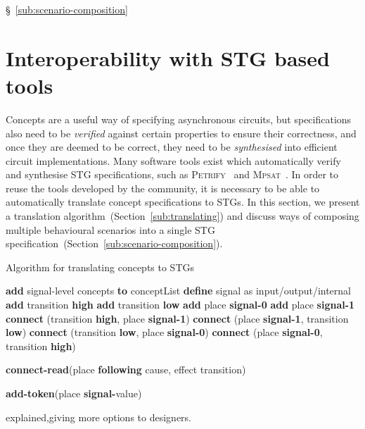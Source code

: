 \documentclass[british, journal]{IEEEtran}
\newcommand{\noun}[1]{\textsc{#1}}
\begin{document}
\S~\ref{sub:scenario-composition}
\vspace{-1mm}
\section{Interoperability with STG based tools\label{sec:interop-with-stg}}

Concepts are a useful way of specifying asynchronous circuits, but
specifications also need to be \emph{verified} against certain properties to
ensure
their correctness, and once they are deemed to be correct, they need to
be \emph{synthesised} into efficient circuit implementations. Many software
tools exist which automatically verify and synthesise STG specifications,
such as \noun{Petrify}~\cite{Cortadella} and
\noun{Mpsat}~\cite{khomenko2004detecting}.
In order to reuse the tools developed by the community, it is
necessary to be able to automatically translate concept specifications to STGs.
In this section, we present a translation
algorithm~(Section~\ref{sub:translating})
and discuss ways of composing multiple behavioural scenarios into a single STG
specification~(Section~\ref{sub:scenario-composition}).

\begin{algorithm}[t]
\begin{algorithmic}
\caption{Algorithm for translating concepts to STGs\label{alg:translation}}
  \State \textbf{add} signal-level concepts \textbf{to} conceptList
\EndFor
  \State \textbf{define} signal as input/output/internal
  \State \textbf{add} transition \textbf{high}
  \State \textbf{add} transition \textbf{low}
  \State \textbf{add} place \textbf{signal-0}
  \State \textbf{add} place \textbf{signal-1}
  \State \textbf{connect} (transition \textbf{high}, place \textbf{signal-1})
  \State \textbf{connect} (place \textbf{signal-1}, transition \textbf{low})
  \State \textbf{connect} (transition \textbf{low}, place \textbf{signal-0})
  \State \textbf{connect} (place \textbf{signal-0}, transition \textbf{high})
\EndFor

\State \textbf{connect-read}(place \textbf{following} cause, effect transition)\EndFor

  \State \textbf{add-token}(place \textbf{signal-}value)
\EndFor

\end{algorithmic}
\end{algorithm}
explained,giving more options to designers.
\end{document}
